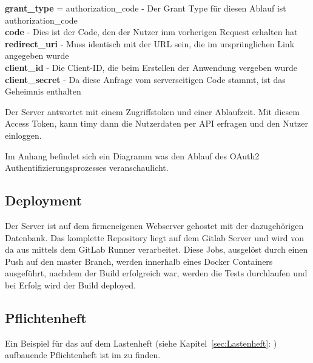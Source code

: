\textbf{grant\_type} = authorization\_code - Der Grant Type für diesen Ablauf ist authorization\_code \\
\textbf{code} - Dies ist der Code, den der Nutzer inm vorherigen Request erhalten hat \\
\textbf{redirect\_uri} - Muss identisch mit der URL sein, die im ursprünglichen Link angegeben wurde \\
\textbf{client\_id} - Die Client-ID, die beim Erstellen der Anwendung vergeben wurde \\
\textbf{client\_secret} - Da diese Anfrage vom serverseitigen Code stammt, ist das Geheimnis enthalten

Der Server antwortet mit einem Zugriffstoken und einer Ablaufzeit. Mit diesem Access Token, kann timy dann die Nutzerdaten per API erfragen und den Nutzer einloggen.

Im Anhang  befindet sich ein Diagramm was den Ablauf des OAuth2 Authentifizierungsprozesses veranschaulicht. 

\subsection{Deployment}
\label{sec:Deployment}

Der Server ist auf dem firmeneigenen Webserver gehostet mit der dazugehörigen Datenbank. Das komplette Repository liegt auf dem Gitlab Server und wird von da aus mittels dem GitLab Runner verarbeitet. Diese Jobs, ausgelöst durch einen Push auf den master Branch, werden innerhalb eines Docker Containers ausgeführt, nachdem der Build erfolgreich war, werden die Tests durchlaufen und bei Erfolg wird der Build deployed. 

\subsection{Pflichtenheft}
\label{sec:Pflichtenheft}

Ein Beispiel für das auf dem Lastenheft (siehe Kapitel~\ref{sec:Lastenheft}: ) aufbauende Pflichtenheft ist im  zu finden.


